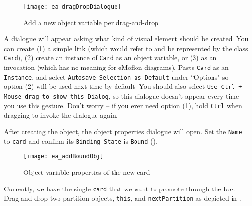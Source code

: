 \begin{stepbystep}
\vspace{0.5cm}

\begin{figure}[htbp]
\begin{center}
  \texttt{[image: ea\_dragDropDialogue]}
  \caption{Add a new object variable per drag-and-drop}
  \label{ea:sdm_check_bound_card}
\end{center}
\end{figure}

\item A dialogue will appear asking what kind of visual element should be created. You can create (1) a simple link (which would refer to
and be represented by the class \texttt{Card}), (2) create an instance of \texttt{Card} as an object variable, or (3) as an invocation (which has no meaning
for eMoflon diagrams). Paste \texttt{Card} as an \texttt{Instance}, and select \texttt{Autosave Selection as Default} under ``Options" so option (2) will be
used next time by default. You should also select \texttt{Use Ctrl + Mouse drag to show this Dialog}, so this dialogue doesn't appear every time you use this
gesture. Don't worry -- if you ever need option (1), hold \texttt{Ctrl} when dragging to invoke the dialogue again.

\vspace{0.5cm}

\item After creating the object, the object properties dialogue will open.  Set the \texttt{Name} to \texttt{card} and confirm its
\texttt{Binding State} is \texttt{Bound} ().

\begin{figure}[htbp]
\begin{center}
  \texttt{[image: ea\_addBoundObj]}
  \caption{Object variable properties of the new card}
  \label{ea:sdm_new_card_properties}
\end{center}
\end{figure}

\vspace{0.5cm}

\item Currently, we have the single \texttt{card} that we want to promote through the box. Drag-and-drop two partition objects,
\texttt{this}, and \texttt{next\-Part\-it\-ion} as depicted in .

\vspace{0.5cm}


\end{stepbystep}
